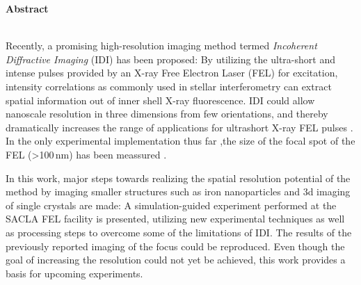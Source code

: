 	\begin{Huge}
		\textbf{Abstract}\vspace{12mm}
	\end{Huge}
\\
Recently, a promising high-resolution imaging method termed \textit{Incoherent Diffractive Imaging} (IDI) has been proposed: By utilizing the ultra-short and intense pulses provided by an X-ray Free Electron Laser (FEL) for excitation,  intensity correlations as commonly used in stellar interferometry can extract spatial information out of inner shell X-ray fluorescence.  IDI could allow nanoscale resolution in three dimensions from few orientations, and thereby dramatically increases the range of applications for ultrashort X-ray FEL pulses \cite{classen2017}. In the only experimental implementation thus far ,the size of the focal spot of the FEL (>100\,nm) has been meassured \cite{nakumura2020}.

In this work, major steps towards realizing the spatial resolution potential of the method by imaging smaller structures such as iron nanoparticles and 3d imaging of single crystals are made: A simulation-guided experiment performed at the SACLA FEL facility is presented, utilizing new experimental techniques as well as processing steps to overcome some of the limitations of IDI. 
The results of the previously reported imaging of the focus could be reproduced. 
Even though the goal of increasing the resolution could not yet be achieved, this work provides a basis for upcoming experiments.

 \vspace{1cm}
 
